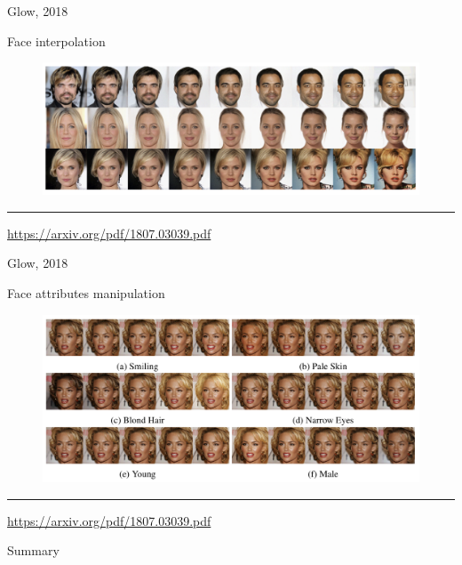 \documentclass{beamer}
\begin{document}
\begin{frame}{Glow, 2018}
	\begin{block}{Face interpolation}
		\begin{figure}
			\centering
			\includegraphics[width=\linewidth]{figs/glow_interpolation.png}
		\end{figure}
	\end{block}
	\vfill
	\hrule\medskip
	{\scriptsize \href{https://arxiv.org/pdf/1807.03039.pdf}{https://arxiv.org/pdf/1807.03039.pdf}}   
\end{frame}
\begin{frame}{Glow, 2018}
	\begin{block}{Face attributes manipulation}
		\begin{figure}
			\centering
			\includegraphics[width=\linewidth]{figs/glow_attributes.png}
		\end{figure}
	\end{block}
	\vfill
	\hrule\medskip
	{\scriptsize \href{https://arxiv.org/pdf/1807.03039.pdf}{https://arxiv.org/pdf/1807.03039.pdf}}   
\end{frame}
\begin{frame}{Summary}
	
\end{frame}
\end{document}
